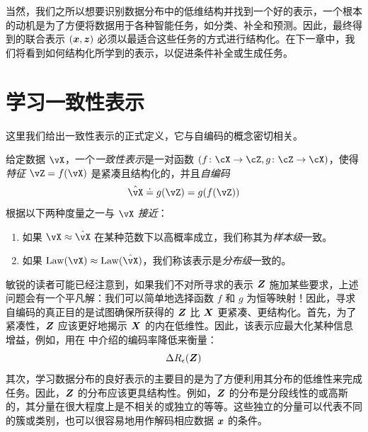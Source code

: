 \documentclass[../../book-main.tex]{subfiles}
\begin{document}
当然，我们之所以想要识别数据分布中的低维结构并找到一个好的表示，一个根本的动机是为了方便将数据用于各种智能任务，如分类、补全和预测。因此，最终得到的联合表示 $(\bm{x}, \bm{z})$ 必须以最适合这些任务的方式进行结构化。在下一章中，我们将看到如何结构化所学到的表示，以促进条件补全或生成任务。

\section{学习一致性表示}\label{sec:consistent-representation}

这里我们给出一致性表示的正式定义，它与自编码的概念密切相关。%
\begin{definition}[一致性表示]\label{def:bidirectional_rep}
  给定数据 \(\vX\)，一个\textit{一致性表示}是一对函数 \((f \colon \cX \to \cZ, g \colon \cZ \to \cX)\)，使得\textit{特征} \(\vZ = f(\vX)\) 是紧凑且结构化的，并且\textit{自编码} \[\hat{\vX} \doteq g(\vZ)
  = g(f(\vZ))\] 根据以下两种度量之一与 \(\vX\) \textit{接近}：
  \begin{enumerate}
    \item 如果 \(\vX \approx \hat{\vX}\) 在某种范数下以高概率成立，我们称其为\textit{样本级}一致。
    \item 如果 \(\Law(\vX) \approx \Law(\hat{\vX})\)，我们称该表示是\textit{分布级}一致的。
  \end{enumerate}
\end{definition}

敏锐的读者可能已经注意到，如果我们不对所寻求的表示 $\bm{Z}$ 施加某些要求，上述问题会有一个平凡解：我们可以简单地选择函数 $f$ 和 $g$ 为恒等映射！因此，寻求自编码的真正目的是试图确保所获得的 $\bm{Z}$ 比 $\bm{X}$ 更紧凑、更结构化。首先，为了紧凑性，$\bm{Z}$ 应该更好地揭示 $\bm{X}$ 的内在低维性。因此，该表示应最大化某种信息增益，例如，用在  中介绍的编码率降低来衡量：
\begin{equation}
  \Delta R_{\epsilon}(\bm{Z})
\end{equation}
其次，学习数据分布的良好表示的主要目的是为了方便利用其分布的低维性来完成任务。因此，$\bm{Z}$ 的分布应该更具结构性。例如，$\bm{Z}$ 的分布是分段线性的或高斯的，其分量在很大程度上是不相关的或独立的等等。这些独立的分量可以代表不同的簇或类别，也可以很容易地用作解码相应数据 $\bm{x}$ 的条件。
\end{document}
